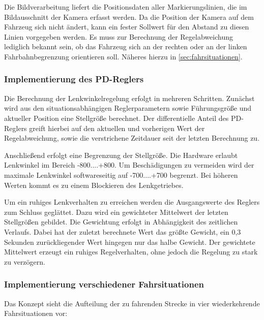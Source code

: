 Die Bildverarbeitung liefert die Positionsdaten aller Markierungslinien, die im Bildausschnitt der Kamera erfasst werden. Da die Position der Kamera auf dem Fahrzeug sich nicht ändert, kann ein fester Sollwert für den Abstand zu diesen Linien vorgegeben werden. Es muss zur Berechnung der Regelabweichung lediglich bekannt sein, ob das Fahrzeug sich an der rechten oder an der linken Fahrbahnbegrenzung orientieren soll. Näheres hierzu in \autoref{sec:fahrsituationen}.


\subsubsection{Implementierung des PD-Reglers}
\label{sec:pdregler}

Die Berechnung der Lenkwinkelregelung erfolgt in mehreren Schritten. Zunächst wird aus den situationsabhängigen Reglerparametern sowie Führungsgröße und aktueller Position eine Stellgröße berechnet. Der differentielle Anteil des PD-Reglers greift hierbei auf den aktuellen und vorherigen Wert der Regelabweichung, sowie die verstrichene Zeitdauer seit der letzten Berechnung zu.


Anschließend erfolgt eine Begrenzung der Stellgröße. Die Hardware erlaubt Lenkwinkel im Bereich -800....+800. Um Beschädigungen zu vermeiden wird der maximale Lenkwinkel softwareseitig auf -700....+700 begrenzt. Bei höheren Werten kommt es zu einem Blockieren des Lenkgetriebes.

Um ein ruhiges Lenkverhalten zu erreichen werden die Ausgangswerte des Reglers zum Schluss geglättet. Dazu wird ein gewichteter Mittelwert der letzten Stellgrößen gebildet. Die Gewichtung erfolgt in Abhängigkeit des zeitlichen Verlaufs. Dabei hat der zuletzt berechnete Wert das größte Gewicht, ein 0,3 Sekunden zurückliegender Wert hingegen nur das halbe Gewicht. Der gewichtete Mittelwert erzeugt ein ruhiges Regelverhalten, ohne jedoch die Regelung zu stark zu verzögern.


\subsubsection{Implementierung verschiedener Fahrsituationen}
\label{sec:fahrsituationen}

Das Konzept sieht die Aufteilung der zu fahrenden Strecke in vier wiederkehrende Fahrsituationen vor:

